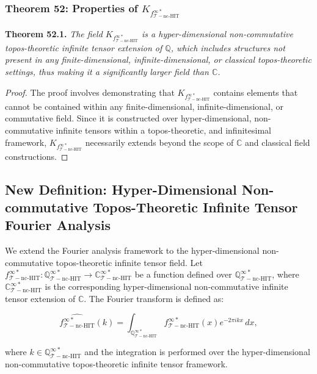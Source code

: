 \documentclass{article}
\begin{document}
\subsubsection{Theorem 52: Properties of \(K_{f_{\mathcal{T}-\text{nc-HIT}}^{\infty *}}\)}
\textbf{Theorem 52.1.} \textit{The field \(K_{f_{\mathcal{T}-\text{nc-HIT}}^{\infty *}}\) is a hyper-dimensional non-commutative topos-theoretic infinite tensor extension of \(\mathbb{Q}\), which includes structures not present in any finite-dimensional, infinite-dimensional, or classical topos-theoretic settings, thus making it a significantly larger field than \(\mathbb{C}\).}

\begin{proof}
The proof involves demonstrating that \(K_{f_{\mathcal{T}-\text{nc-HIT}}^{\infty *}}\) contains elements that cannot be contained within any finite-dimensional, infinite-dimensional, or commutative field. Since it is constructed over hyper-dimensional, non-commutative infinite tensors within a topos-theoretic, and infinitesimal framework, \(K_{f_{\mathcal{T}-\text{nc-HIT}}^{\infty *}}\) necessarily extends beyond the scope of \(\mathbb{C}\) and classical field constructions.
\end{proof}

\subsection{New Definition: Hyper-Dimensional Non-commutative Topos-Theoretic Infinite Tensor Fourier Analysis}
We extend the Fourier analysis framework to the hyper-dimensional non-commutative topos-theoretic infinite tensor field. Let \(f_{\mathcal{T}-\text{nc-HIT}}^{\infty *}: \mathbb{Q}_{\mathcal{T}-\text{nc-HIT}}^{\infty *} \to \mathbb{C}_{\mathcal{T}-\text{nc-HIT}}^{\infty *}\) be a function defined over \(\mathbb{Q}_{\mathcal{T}-\text{nc-HIT}}^{\infty *}\), where \(\mathbb{C}_{\mathcal{T}-\text{nc-HIT}}^{\infty *}\) is the corresponding hyper-dimensional non-commutative infinite tensor extension of \(\mathbb{C}\). The Fourier transform is defined as:

\[
\widehat{f_{\mathcal{T}-\text{nc-HIT}}^{\infty *}}(k) = \int_{\mathbb{Q}_{\mathcal{T}-\text{nc-HIT}}^{\infty *}} f_{\mathcal{T}-\text{nc-HIT}}^{\infty *}(x) e^{-2\pi i k x} \, dx,
\]

where \(k \in \mathbb{Q}_{\mathcal{T}-\text{nc-HIT}}^{\infty *}\) and the integration is performed over the hyper-dimensional non-commutative topos-theoretic infinite tensor framework.
\end{document}
